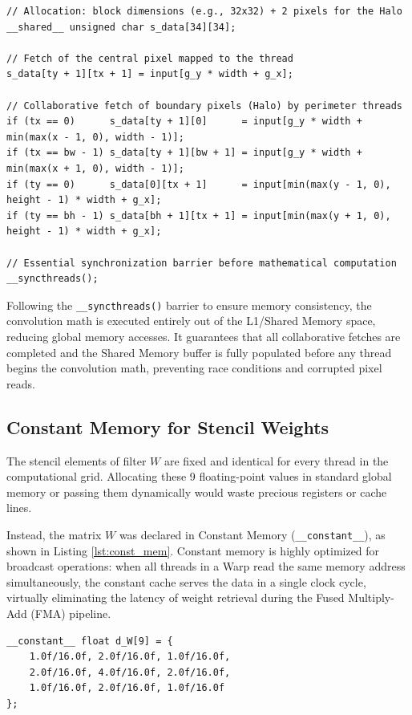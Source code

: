 \documentclass[conference]{IEEEtran}
\numberwithin{figure}{section}
\numberwithin{table}{section}
\begin{document}
\begin{lstlisting}[style=cppstyle, caption={Shared memory allocation and collaborative fetching of the Halo region.}, label={lst:shared_mem}]
// Allocation: block dimensions (e.g., 32x32) + 2 pixels for the Halo
__shared__ unsigned char s_data[34][34];

// Fetch of the central pixel mapped to the thread
s_data[ty + 1][tx + 1] = input[g_y * width + g_x];

// Collaborative fetch of boundary pixels (Halo) by perimeter threads
if (tx == 0)      s_data[ty + 1][0]      = input[g_y * width + min(max(x - 1, 0), width - 1)];
if (tx == bw - 1) s_data[ty + 1][bw + 1] = input[g_y * width + min(max(x + 1, 0), width - 1)];
if (ty == 0)      s_data[0][tx + 1]      = input[min(max(y - 1, 0), height - 1) * width + g_x];
if (ty == bh - 1) s_data[bh + 1][tx + 1] = input[min(max(y + 1, 0), height - 1) * width + g_x];

// Essential synchronization barrier before mathematical computation
__syncthreads();
\end{lstlisting}

Following the \texttt{\_\_syncthreads()} barrier to ensure memory consistency, the convolution math is executed entirely out of the L1/Shared Memory space, reducing global memory accesses. It guarantees that all collaborative fetches are completed and the Shared Memory buffer is fully populated before any thread begins the convolution math, preventing race conditions and corrupted pixel reads.

\subsection*{Constant Memory for Stencil Weights}
The stencil elements of filter $W$ are fixed and identical for every thread in the computational grid. Allocating these 9 floating-point values in standard global memory or passing them dynamically would waste precious registers or cache lines. 

Instead, the matrix $W$ was declared in Constant Memory (\texttt{\_\_constant\_\_}), as shown in Listing \ref{lst:const_mem}. Constant memory is highly optimized for broadcast operations: when all threads in a Warp read the same memory address simultaneously, the constant cache serves the data in a single clock cycle, virtually eliminating the latency of weight retrieval during the Fused Multiply-Add (FMA) pipeline.

\begin{lstlisting}[style=cppstyle, caption={Filter weights statically allocated in GPU Constant Memory.}, label={lst:const_mem}]
__constant__ float d_W[9] = {
    1.0f/16.0f, 2.0f/16.0f, 1.0f/16.0f,
    2.0f/16.0f, 4.0f/16.0f, 2.0f/16.0f,
    1.0f/16.0f, 2.0f/16.0f, 1.0f/16.0f
};
\end{lstlisting}
\end{document}
